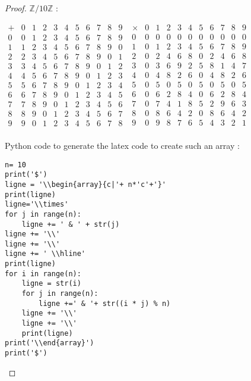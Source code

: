 \documentclass[11pt,a4paper]{article}
\newcommand{\Z}{\mathbb{Z}}
\begin{document}
{\begin{proof}
$\Z/10\Z$ : 

\medskip

$
\begin{array}{c|cccccccccc}
+ & 0 & 1 & 2 & 3 & 4 & 5 & 6 & 7 & 8 & 9\\ \hline
0 & 0 & 1 & 2 & 3 & 4 & 5 & 6 & 7 & 8 & 9\\
1 & 1 & 2 & 3 & 4 & 5 & 6 & 7 & 8 & 9 & 0\\
2 & 2 & 3 & 4 & 5 & 6 & 7 & 8 & 9 & 0 & 1\\
3 & 3 & 4 & 5 & 6 & 7 & 8 & 9 & 0 & 1 & 2\\
4 & 4 & 5 & 6 & 7 & 8 & 9 & 0 & 1 & 2 & 3\\
5 & 5 & 6 & 7 & 8 & 9 & 0 & 1 & 2 & 3 & 4\\
6 & 6 & 7 & 8 & 9 & 0 & 1 & 2 & 3 & 4 & 5\\
7 & 7 & 8 & 9 & 0 & 1 & 2 & 3 & 4 & 5 & 6\\
8 & 8 & 9 & 0 & 1 & 2 & 3 & 4 & 5 & 6 & 7\\
9 & 9 & 0 & 1 & 2 & 3 & 4 & 5 & 6 & 7 & 8\\
\end{array}
$
\qquad
$
\begin{array}{c|cccccccccc}
\times & 0 & 1 & 2 & 3 & 4 & 5 & 6 & 7 & 8 & 9\\ \hline
0 & 0 & 0 & 0 & 0 & 0 & 0 & 0 & 0 & 0 & 0\\
1 & 0 & 1 & 2 & 3 & 4 & 5 & 6 & 7 & 8 & 9\\
2 & 0 & 2 & 4 & 6 & 8 & 0 & 2 & 4 & 6 & 8\\
3 & 0 & 3 & 6 & 9 & 2 & 5 & 8 & 1 & 4 & 7\\
4 & 0 & 4 & 8 & 2 & 6 & 0 & 4 & 8 & 2 & 6\\
5 & 0 & 5 & 0 & 5 & 0 & 5 & 0 & 5 & 0 & 5\\
6 & 0 & 6 & 2 & 8 & 4 & 0 & 6 & 2 & 8 & 4\\
7 & 0 & 7 & 4 & 1 & 8 & 5 & 2 & 9 & 6 & 3\\
8 & 0 & 8 & 6 & 4 & 2 & 0 & 8 & 6 & 4 & 2\\
9 & 0 & 9 & 8 & 7 & 6 & 5 & 4 & 3 & 2 & 1\\
\end{array}
$

\bigskip

Python code to generate the latex code to create such an array :
\begin{verbatim}
n= 10
print('$')
ligne = '\\begin{array}{c|'+ n*'c'+'}'
print(ligne)
ligne='\\times'
for j in range(n):
    ligne += ' & ' + str(j)
ligne += '\\'
ligne += '\\'
ligne += ' \\hline'
print(ligne)
for i in range(n):
    ligne = str(i)
    for j in range(n):
        ligne +=' & '+ str((i * j) % n)
    ligne += '\\'
    ligne += '\\'
    print(ligne)
print('\\end{array}')
print('$')
\end{verbatim}
\end{proof}

}
\end{document}
